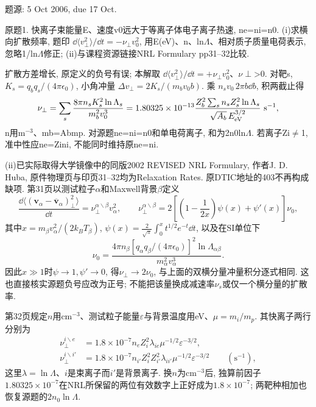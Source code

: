 题源: 5 Oct 2006, due 17 Oct.
\begin{exercise}\label{ex:06-4-1}
原题1. 快离子束能量E、速度v0远大于等离子体电子离子热速, ne=ni=n0. (i)求横向扩散频率, 题印 $\dd\langle v_\perp^2\rangle/\dd t=-\nu_\perp v_0^2$, 用E(eV)、n、ln\ensuremath{\Lambda}、相对质子质量电荷表示, 忽略1/ln\ensuremath{\Lambda}修正; (ii)与课程资源链接NRL Formulary pp31--32比较.
\end{exercise}
\begin{solution}
扩散方差增长, 原定义的负号有误; 本解取 $\dd\langle v_\perp^2\rangle/\dd t=+\nu_\perp v_0^2$、\ensuremath{\nu}\ensuremath{\perp}>0. 对靶s, $K_s=q_bq_s/(4\pi\epsilon_0)$, 小角冲量 $\Delta v_\perp=2K_s/(m_bv_0b)$. 乘 $n_sv_0\,2\pi b\dd b$, 积两截止得
\begin{equation}
 \nu_\perp=\sum_s\frac{8\pi n_sK_s^2\ln\Lambda_s}{m_b^2v_0^3}
 =1.80325\times10^{-13}\frac{Z_b^2\sum_s n_sZ_s^2\ln\Lambda_s}{\sqrt{A_b}\,E_{\rm eV}^{3/2}}\ \mathrm{s}^{-1},
\end{equation}
n用m$^{-3}$、mb=Abmp. 对源题ne=ni=n0和单电荷离子, 和为2n0ln\ensuremath{\Lambda}. 若离子Zi\ensuremath{\ne}1, 准中性应ne=Zini, 不能同时维持原ne=ni.

(ii)已实际取得大学镜像中的同版2002 REVISED NRL Formulary, 作者J. D. Huba, 原件物理页与印页31--32均为Relaxation Rates. 原DTIC地址的403不再构成缺项. 第31页以测试粒子$\alpha$和Maxwell背景$\beta$定义
\begin{equation}
 \frac{\dd\langle(\mathbf v_\alpha-\overline{\mathbf v}_\alpha)_\perp^2\rangle}{\dd t}
 =\nu_\perp^{\alpha\backslash\beta}v_\alpha^2,\qquad
 \nu_\perp^{\alpha\backslash\beta}
 =2\left[\left(1-\frac1{2x}\right)\psi(x)+\psi'(x)\right]\nu_0,
\end{equation}
其中$x=m_\beta v_\alpha^2/(2k_BT_\beta)$,
$\psi(x)=\frac2{\sqrt\pi}\int_0^x t^{1/2}e^{-t}\dd t$,
以及在SI单位下
\begin{equation}
 \nu_0=\frac{4\pi n_\beta[q_\alpha q_\beta/(4\pi\epsilon_0)]^2
 \ln\Lambda_{\alpha\beta}}{m_\alpha^2v_\alpha^3}.
\end{equation}
因此$x\gg1$时$\psi\to1,\psi'\to0$, 得$\nu_\perp\to2\nu_0$, 与上面的双横分量冲量积分逐式相同. 这也直接核实源题负号应改为正号; 不能把该量换成减速率$\nu_s$或仅一个横分量的扩散率.

第32页规定$n$用cm$^{-3}$、测试粒子能量$\varepsilon$与背景温度用eV、$\mu=m_i/m_p$. 其快离子两行分别为
\begin{align}
 \nu_\perp^{i\backslash e}
 &=1.8\times10^{-7}n_eZ_i^2\lambda_{ie}
   \mu^{-1/2}\varepsilon^{-3/2},\\
 \nu_\perp^{i\backslash i'}
 &=1.8\times10^{-7}n_{i'}Z_i^2Z_{i'}^2\lambda_{ii'}
   \mu^{-1/2}\varepsilon^{-3/2}\qquad(\mathrm{s}^{-1}),
\end{align}
这里$\lambda=\ln\Lambda$、$i$是束离子而$i'$是背景离子. 换$n$为cm$^{-3}$后, 独算前因子$1.80325\times10^{-7}$在NRL所保留的两位有效数字上正好成为$1.8\times10^{-7}$; 两靶种相加也恢复源题的$2n_0\ln\Lambda$.


\end{solution}
